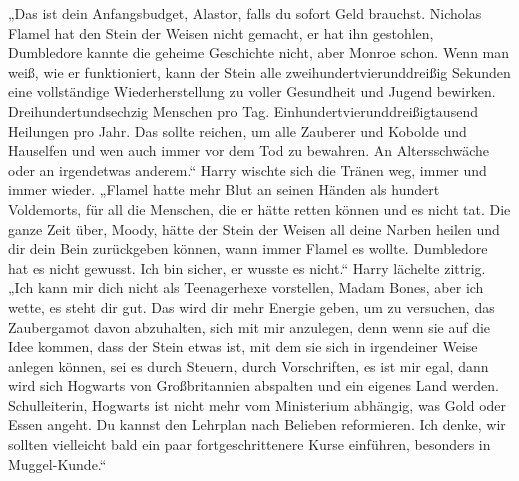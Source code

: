 „Das ist dein Anfangsbudget, Alastor, falls du sofort Geld brauchst. Nicholas Flamel hat den Stein der Weisen nicht gemacht, er hat ihn gestohlen, Dumbledore kannte die geheime Geschichte nicht, aber Monroe schon. Wenn man weiß, wie er funktioniert, kann der Stein alle zweihundertvierunddreißig Sekunden eine vollständige Wiederherstellung zu voller Gesundheit und Jugend bewirken. Dreihundertundsechzig Menschen pro Tag. Einhundertvierunddreißigtausend Heilungen pro Jahr. Das sollte reichen, um alle Zauberer und Kobolde und Hauselfen und wen auch immer vor dem Tod zu bewahren. An Altersschwäche oder an irgendetwas anderem.“
Harry wischte sich die Tränen weg, immer und immer wieder.
„Flamel hatte mehr Blut an seinen Händen als hundert Voldemorts, für all die Menschen, die er hätte retten können und es nicht tat. Die ganze Zeit über, Moody, hätte der Stein der Weisen all deine Narben heilen und dir dein Bein zurückgeben können, wann immer Flamel es wollte. Dumbledore hat es nicht gewusst. Ich bin sicher, er wusste es nicht.“
Harry lächelte zittrig.
„Ich kann mir dich nicht als Teenagerhexe vorstellen, Madam Bones, aber ich wette, es steht dir gut. Das wird dir mehr Energie geben, um zu versuchen, das Zaubergamot davon abzuhalten, sich mit mir anzulegen, denn wenn sie auf die Idee kommen, dass der Stein etwas ist, mit dem sie sich in irgendeiner Weise anlegen können, sei es durch Steuern, durch Vorschriften, es ist mir egal, dann wird sich Hogwarts von Großbritannien abspalten und ein eigenes Land werden. Schulleiterin, Hogwarts ist nicht mehr vom Ministerium abhängig, was Gold oder Essen angeht. Du kannst den Lehrplan nach Belieben reformieren. Ich denke, wir sollten vielleicht bald ein paar fortgeschrittenere Kurse einführen, besonders in Muggel-Kunde.“

